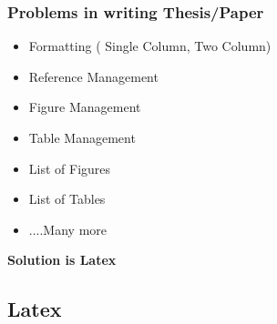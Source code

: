 \documentclass [9pt] {beamer}
\begin{document}
\begin{frame}\frametitle{Problems in writing Thesis/Paper}
\rm
\fontsize{9pt}{11pt}\selectfont
\begin{itemize}
\fontsize{8pt}{10pt}\selectfont
\item Formatting ( Single Column, Two Column) \\[.30cm]

\item Reference Management\\[.30cm]
\item Figure Management\\[.30cm]

\item Table Management\\[.30cm]

\item List of Figures\\[.30cm]

\item List of Tables\\[.30cm]
\item ....Many more
\end{itemize}
\end{frame}


\begin{frame}%
\begin{center}
\Huge\textcolor[rgb]{0.98,0.00,0.00}{\textbf{Solution is Latex}}
\end{center}
\end{frame}



\subsection{Latex}\label{Latex}
\end{document}
